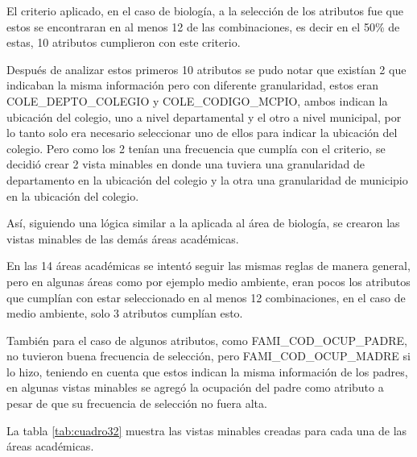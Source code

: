 El criterio aplicado, en el caso de biología, a la selección de los atributos fue que estos se encontraran en al menos 12 de las combinaciones, es decir en el 50\% de estas, 10 atributos cumplieron con este criterio.

Después de analizar estos primeros 10 atributos se pudo notar que existían 2 que indicaban la misma información pero con diferente granularidad, estos eran COLE_DEPTO_COLEGIO y COLE_CODIGO_MCPIO, ambos indican la ubicación del colegio, uno a nivel departamental y el otro a nivel municipal, por lo tanto solo era necesario seleccionar uno de ellos para indicar la ubicación del colegio. Pero como los 2 tenían una frecuencia que cumplía con el criterio, se decidió crear 2 vista minables en donde una tuviera una granularidad de departamento en la ubicación del colegio y la otra una granularidad de municipio en la ubicación del colegio.

Así, siguiendo una lógica similar a la aplicada al área de biología, se crearon las vistas minables de las demás áreas académicas.

En las 14 áreas académicas se intentó seguir las mismas reglas de manera general, pero en algunas áreas como por ejemplo medio ambiente, eran pocos los atributos que cumplían con estar seleccionado en al menos 12 combinaciones, en el caso de medio ambiente, solo 3 atributos cumplían esto.
 
También para el caso de algunos atributos, como FAMI_COD_OCUP_PADRE, no tuvieron buena frecuencia de selección, pero FAMI_COD_OCUP_MADRE si lo hizo, teniendo en cuenta que estos indican la misma información de los padres, en algunas vistas minables se agregó la ocupación del padre como atributo a pesar de que su frecuencia de selección no fuera alta.

La tabla \ref{tab:cuadro32} muestra las vistas minables creadas para cada una de las áreas académicas.

